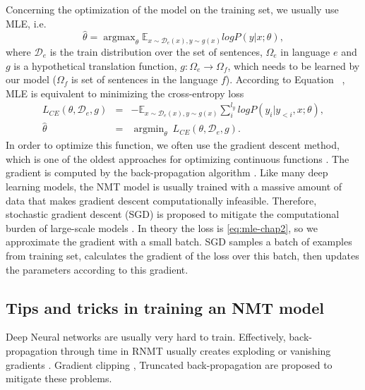 Concerning the optimization of the model on the training set, we usually use MLE, i.e.
\begin{equation}
\hat{\theta} = \displaystyle{\mathop{argmax}_{\theta}\mathbb{E}_{x \sim \mathcal{D}_e(x), y \sim g(x)}}log P(y|x;\theta),
\label{eq:mle-chap2}
\end{equation}
where $\mathcal{D}_e$ is the train distribution over the set of sentences, $\Omega_e$ in language $e$ and $g$ is a hypothetical translation function, $g:\Omega_e \rightarrow \Omega_f$, which needs to be learned by our model ($\Omega_f$ is set of sentences in the language $f$). According to Equation ~, MLE is equivalent to minimizing the cross-entropy loss
\begin{equation}
\begin{array}{rcl}
L_{CE}(\theta, \mathcal{D}_e, g) &=& -\displaystyle{\mathbb{E}_{x \sim \mathcal{D}_e(x), y \sim g(x)} \mathop{\sum}_{i}^{l_y}}log P(y_i|y_{<i},x;\theta), \\
\hat{\theta} &=& \displaystyle{\mathop{argmin}_{\theta}} \ L_{CE}(\theta,\mathcal{D}_e,g).
\end{array}
\label{eq:ce-chap2}
\end{equation}
In order to optimize this function, we often use the gradient descent method, which is one of the oldest approaches for optimizing continuous functions \citep{Cauchy1847method}. The gradient is computed by the back-propagation algorithm \citep{Rumelhart88learning}. Like many deep learning models, the NMT model is usually trained with a massive amount of data that makes gradient descent computationally infeasible. Therefore, stochastic gradient descent (SGD) is proposed to mitigate the computational burden of large-scale models \citep{Herbert51stochastic,Kiefer52stochastic,Bottou10large}. In theory the loss is \eqref{eq:mle-chap2}, so we approximate the gradient with a small batch. SGD samples a batch of examples from training set, calculates the gradient of the loss over this batch, then updates the parameters according to this gradient.
\subsection{Tips and tricks in training an NMT model}
Deep Neural networks are usually very hard to train. Effectively, back-propagation through time in RNMT usually creates exploding or vanishing gradients \citep{Glorot10understanding,Pascanu13onthe}. Gradient clipping \citep{Pascanu13onthe}, Truncated back-propagation \citep{Jaeger02tutorial} are proposed to mitigate these problems.

